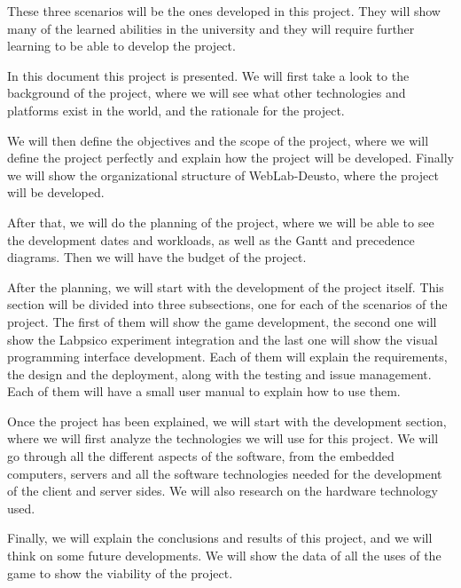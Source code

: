 These three scenarios will be the ones developed in this project. They will show many of the learned
abilities in the university and they will require further learning to be able to develop the
project.

In this document this project is presented. We will first take a look to the background of the
project, where we will see what other technologies and platforms exist in the world, and the
rationale for the project.

We will then define the objectives and the scope of the project, where we will define the project
perfectly and explain how the project will be developed. Finally we will show the organizational
structure of WebLab-Deusto, where the project will be developed.

After that, we will do the planning of the project, where we will be able to see the development
dates and workloads, as well as the Gantt and precedence diagrams. Then we will have the budget of
the project.

After the planning, we will start with the development of the project itself. This section will be
divided into three subsections, one for each of the scenarios of the project. The first of them will
show the game development, the second one will show the Labpsico experiment integration and the last
one will show the visual programming interface development. Each of them will explain the
requirements, the design and the deployment, along with the testing and issue management. Each of
them will have a small user manual to explain how to use them.

Once the project has been explained, we will start with the development section, where we will first
analyze the technologies we will use for this project. We will go through all the different aspects
of the software, from the embedded computers, servers and all the software technologies needed for
the development of the client and server sides. We will also research on the hardware technology
used.

Finally, we will explain the conclusions and results of this project, and we will think on some
future developments. We will show the data of all the uses of the game to show the viability of the
project.
